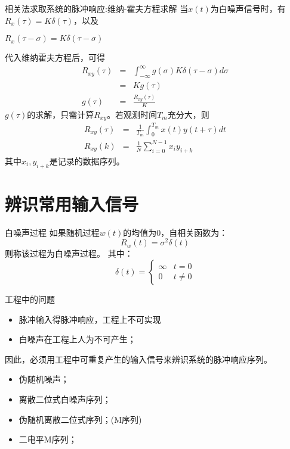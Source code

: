 \begin{frame}{相关法求取系统的脉冲响应:维纳-霍夫方程求解}
当$x(t)$为白噪声信号时，有$R_x(\tau)=K\delta(\tau)$，以及

$R_x(\tau-\sigma) =  K\delta(\tau-\sigma)$

代入维纳霍夫方程后，可得
\begin{eqnarray*}
R_{xy}(\tau) &=& \int_{-\infty}^{\infty}g(\sigma)K\delta(\tau-\sigma)d\sigma \\
&=& Kg(\tau) \\
g(\tau)&=& \frac{R_{xy}(\tau)}{K}
\end{eqnarray*}
$g(\tau)$的求解，只需计算$R_{xy}$。若观测时间$T_m$充分大，则
\begin{eqnarray*}
R_{xy}(\tau) &=& \frac{1}{T_m}\int_0^{T_m}x(t)y(t+\tau)dt \\
R_{xy}(k) &=& \frac{1}{N}\sum_{i=0}^{N-1}x_i y_{i+k}
\end{eqnarray*}
其中$x_i,y_{i+k}$是记录的数据序列。
\end{frame}

\section{辨识常用输入信号}
\begin{frame}{白噪声过程}
如果随机过程$w(t)$的均值为0，自相关函数为：
$$
R_w(t)=\sigma^2\delta(t)
$$
则称该过程为白噪声过程。
其中：
$$
\delta(t)=\begin{cases}
\infty & t=0 \\  0 & t\neq 0
\end{cases}
$$
\end{frame}

\begin{frame}{工程中的问题}
\begin{itemize}
\item  脉冲输入得脉冲响应，工程上不可实现
\item  白噪声在工程上人为不可产生；
\end{itemize}
因此，必须用工程中可重复产生的输入信号来辨识系统的脉冲响应序列。
\begin{itemize}
\item 伪随机噪声；
\item 离散二位式白噪声序列；
\item 伪随机离散二位式序列；(M序列)
\item 二电平M序列；
\end{itemize}
\end{frame}

